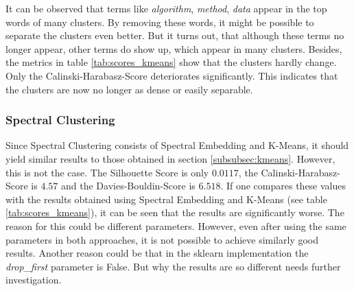 It can be observed that terms like \textit{algorithm}, \textit{method}, \textit{data} appear in the top words of many clusters.
By removing these words, it might be possible to separate the clusters even better. 
But it turns out, that although these terms no longer appear, other terms do show up, which appear in many clusters.
Besides, the metrics in table \ref{tab:scores_kmeans} show that the clusters hardly change.
Only the Calinski-Harabasz-Score deteriorates significantly. This indicates that the clusters are now no longer as dense or easily separable.


\subsubsection{Spectral Clustering}
Since Spectral Clustering consists of Spectral Embedding and K-Means, it should yield similar results to those obtained in section \ref{subsubsec:kmeans}.
However, this is not the case.
The Silhouette Score is only $0.0117$, the Calinski-Harabasz-Score is $4.57$ and the Davies-Bouldin-Score is $6.518$.
If one compares these values with the results obtained using Spectral Embedding and K-Means (see table \ref{tab:scores_kmeans}), it can be seen that the results are significantly worse.
The reason for this could be different parameters.
However, even after using the same parameters in both approaches, it is not possible to achieve similarly good results. 
Another reason could be that in the sklearn implementation the \textit{drop\_first} parameter is False.
But why the results are so different needs further investigation.



